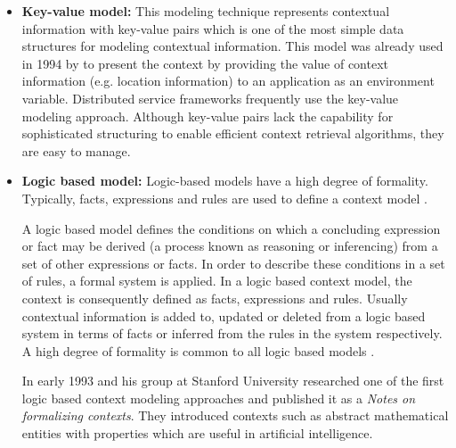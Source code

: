 \begin{itemize}
\item \textbf{Key-value model:}  This modeling technique represents contextual information with key-value pairs which is one of the most simple data structures for modeling contextual information. This model was already used in 1994 by \citeauthor{ieee512740} to present the context by providing the value of context information (e.g. location information) to an application as an environment variable. Distributed service frameworks  frequently use the key-value modeling approach. Although key-value pairs lack the capability for sophisticated structuring to enable efficient context retrieval algorithms, they are easy to manage.

\item \textbf{Logic based model: } %
Logic-based models have a high degree of formality. Typically, facts, expressions and rules are used to define a context model \cite{BaldaufDustdarRosenberg07ijahuc}.





A logic based model defines the conditions on which a concluding expression or fact may be derived (a process known as reasoning or inferencing) from a set of other expressions or facts. In order to describe these conditions in a set of rules, a formal system is applied. In a logic based context model, the context is consequently defined as facts, expressions and rules. Usually contextual information is added to, updated or deleted from a logic based system in terms of facts or inferred from the rules in the system respectively. A high degree of formality is common to all logic based models \cite{Strang2004}.

In early 1993 \citeauthor{McCarthy1993Notes} and his group at Stanford University researched one of the first logic based context modeling approaches and published it as a \textit{Notes on formalizing contexts}. They introduced contexts such as abstract mathematical entities with properties which are useful in artificial intelligence.



\end{itemize}
